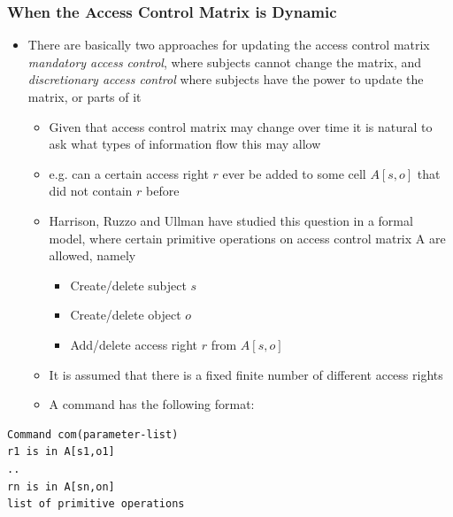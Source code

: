 \documentclass[11pt]{article}
\begin{document}
\subsubsection{When the Access Control Matrix is Dynamic}
\label{sec:orgda7a38a}
\begin{itemize}
\item There are basically two approaches for updating the access control matrix \emph{mandatory access control}, where subjects cannot change the matrix, and \emph{discretionary access control} where subjects have the power to update the matrix, or parts of it
\begin{itemize}
\item Given that access control matrix may change over time it is natural to ask what types of information flow this may allow
\item e.g. can a certain access right \(r\) ever be added to some cell \(A[s, o]\) that did not contain \(r\) before
\item Harrison, Ruzzo and Ullman have studied this question in a formal model, where certain primitive operations on access control matrix A are allowed, namely
\begin{itemize}
\item Create/delete subject \(s\)
\item Create/delete object \(o\)
\item Add/delete access right \(r\) from \(A[s, o]\)
\end{itemize}
\item It is assumed that there is a fixed finite number of different access rights
\item A command has the following format:
\end{itemize}
\end{itemize}
\begin{verbatim}
Command com(parameter-list)
r1 is in A[s1,o1]
..
rn is in A[sn,on]
list of primitive operations
\end{verbatim}
\end{document}
